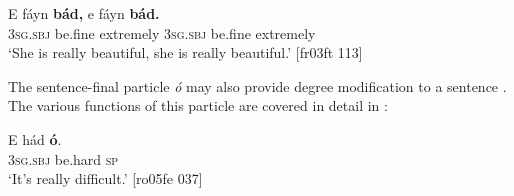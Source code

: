 \ea%
    \label{ex:key:898}
    \gll E    fáyn  \textbf{bád,}      e    fáyn  \textbf{bád.}\\
\textsc{3sg.sbj}  be.fine  extremely  \textsc{3sg.sbj}  be.fine  extremely\\

\glt ‘She is really beautiful, she is really beautiful.’ [fr03ft 113]
\z

The sentence-final particle \textit{ó} may also provide degree modification to a sentence . The various functions of this particle are covered in detail in :


\ea%
    \label{ex:key:899}
    \gll E    hád    \textbf{ó}.\\
\textsc{3sg.sbj}  be.hard  \textsc{sp}\\

\glt ‘It’s really difficult.’ [ro05fe 037]
\z


